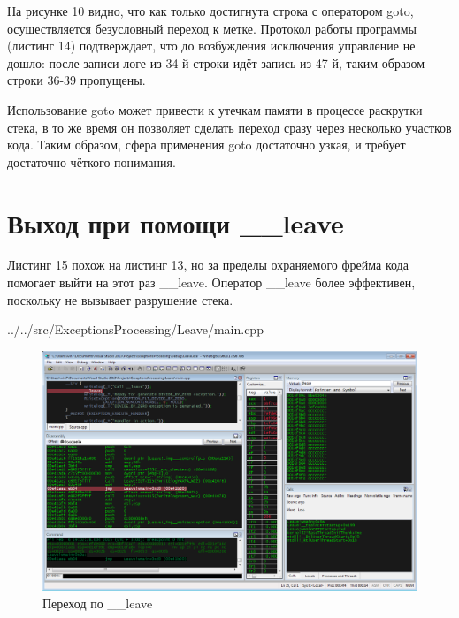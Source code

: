 \documentclass[a4paper, 12pt]{report}		%
\begin{document}
На рисунке 10 видно, что как только достигнута строка с оператором goto, осуществляется безусловный переход к метке. Протокол работы программы (листинг 14) подтверждает, что до возбуждения исключения управление не дошло: после записи  логе из 34-й строки идёт запись из 47-й, таким образом строки 36-39 пропущены.



Использование goto может привести к утечкам памяти в процессе раскрутки стека, в то же время он позволяет сделать переход сразу через несколько участков кода. Таким образом, сфера применения goto достаточно узкая, и требует достаточно чёткого понимания.

\chapter*{Выход при помощи \_\_leave}

Листинг 15 похож на листинг 13, но за пределы охраняемого фрейма кода помогает выйти на этот раз \_\_leave. Оператор \_\_leave более эффективен, поскольку не вызывает разрушение стека.


{../../src/ExceptionsProcessing/Leave/main.cpp}

\begin{figure}[h!]
\centering
\includegraphics[scale=0.50]{res/011}
\caption{Переход по \_\_leave}
\end{figure}


\end{document}
